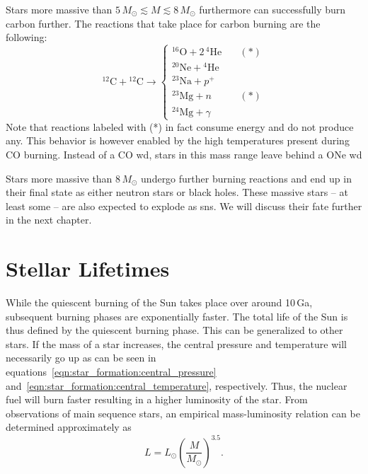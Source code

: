 Stars more massive than $5\,M_\odot \lesssim M \lesssim 8\,M_\odot$ furthermore can successfully burn carbon further. The reactions that take place for carbon burning are the following:
\begin{equation}
    {^{12}}\mathrm{C} + {^{12}}\mathrm{C} \longrightarrow 
    \begin{cases}
        {^{16}}\mathrm{O} + 2\,{^4}\mathrm{He} \quad &(*)\\
        {^{20}}\mathrm{Ne} + {^4}\mathrm{He}\\
        {^{23}}\mathrm{Na} + p^+\\
        {^{23}}\mathrm{Mg} + n \quad &(*)\\
        {^{24}}\mathrm{Mg} + \gamma
    \end{cases}
    \label{eqn:sun:carbon_burning_reactions}
\end{equation}
Note that reactions labeled with (*) in fact consume energy and do not produce any. This behavior is however enabled by the high temperatures present during CO burning. Instead of a CO \ac{wd}, stars in this mass range leave behind a ONe \ac{wd}

Stars more massive than $8\,M_\odot$ undergo further burning reactions and end up in their final state as either neutron stars or black holes. These massive stars -- at least some -- are also expected to explode as \acp{sn}. We will discuss their fate further in the next chapter.


\section{Stellar Lifetimes}

While the quiescent burning of the Sun takes place over around 10\,Ga, subsequent burning phases are exponentially faster. The total life of the Sun is thus defined by the quiescent burning phase. This can be generalized to other stars. If the mass of a star increases, the central pressure and temperature will necessarily go up as can be seen in equations~\eqref{eqn:star_formation:central_pressure} and~\eqref{eqn:star_formation:central_temperature}, respectively. Thus, the nuclear fuel will burn faster resulting in a higher luminosity of the star. From observations of main sequence stars, an empirical mass-luminosity relation can be determined approximately as
\begin{equation}
    L = L_\odot \left(\frac{M}{M_\odot}\right)^{3.5}. \label{eqn:sun:mass_luminosity_relation}
\end{equation}

